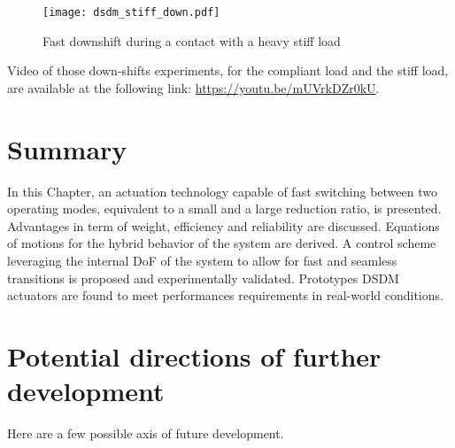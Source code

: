 \begin{figure}[p]
	\centering
		\texttt{[image: dsdm\_stiff\_down.pdf]}
	\caption{ Fast downshift during a contact with a heavy stiff load }
	\label{fig:dsdm_stiff_down}
\end{figure}

Video of those down-shifts experiments, for the compliant load and the stiff load, are available at the following link: \hyperref[https://youtu.be/mUVrkDZr0kU]{https://youtu.be/mUVrkDZr0kU}.

%
%
%






\newpage

\section{Summary}

In this Chapter, an actuation technology capable of fast switching between two operating modes, equivalent to a small and a large reduction ratio, is presented. Advantages in term of weight, efficiency and reliability are discussed. Equations of motions for the hybrid behavior of the system are derived. A control scheme leveraging the internal DoF of the system to allow for fast and seamless transitions is proposed and experimentally validated. Prototypes DSDM actuators are found to meet performances requirements in real-world conditions.

\section{Potential directions of further development}

Here are a few possible axis of future development. 

